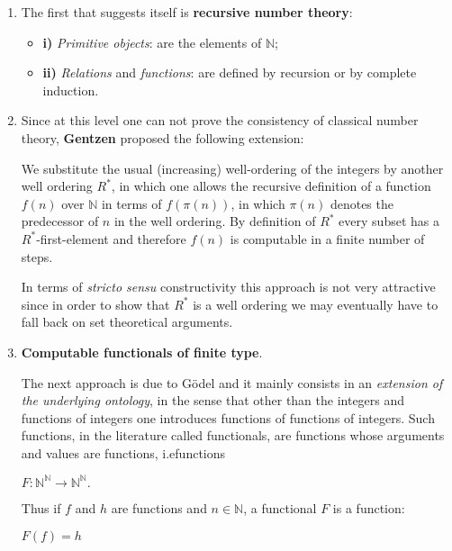 \documentclass[12pt]{article}
\begin{document}
\begin{enumerate}
\item The first that suggests itself is \textbf{recursive number theory}:

\begin{itemize}  
\item \textbf{i)} \emph{Primitive objects}:  are the elements of $\mathbb{N}$;

\item \textbf{ii)} \emph{Relations} and \emph{functions}: are defined by recursion or by complete induction. 
\end{itemize}

\item Since at this level one can not prove the consistency of classical number theory, \textbf{Gentzen} proposed the following extension:

We substitute the usual (increasing) well-ordering of the integers by another well ordering $R^*$, in which one allows the recursive definition of a function $f (n)$ over $\mathbb{N}$ in terms of $f (\pi (n))$, in which $\pi (n)$ denotes the predecessor of $n$ in the well ordering. By definition of $R^*$ every subset has a $R^*$-first-element and therefore $f (n)$ is computable in a finite number of steps.

In terms of \emph{stricto sensu} constructivity this approach is not very attractive since in order to show that $R^*$ is a well ordering we may eventually have to fall back on set theoretical arguments.

\item \textbf{Computable functionals of finite type}.

The next approach is due to G\"odel and it mainly consists in an \emph{extension of the underlying ontology}, in the sense that other than the integers and functions of integers one introduces functions of functions of integers. Such functions, in the literature called functionals, are functions whose arguments and values are functions, i.efunctions 

\begin{center}
$F: \mathbb{N}^{\mathbb{N}} \to \mathbb{N}^{\mathbb{N}}.$ 
\end{center}

Thus if $f$ and $h$ are functions and $n \in \mathbb{N}$, a functional $F$ is a function:

\begin{center}
$F (f) = h$
\end{center}


\end{enumerate}
\end{document}
